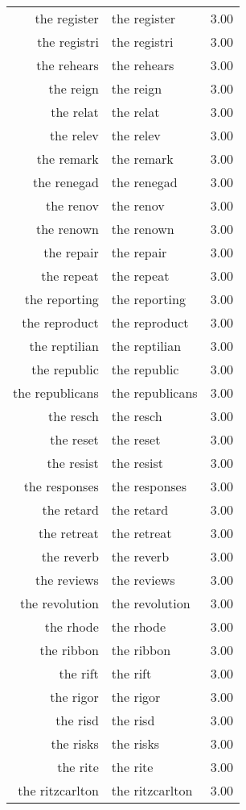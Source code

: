 \begin{table}[ht]
\begin{tabular}{rlr}
  the register & the register & 3.00 \\ 
  the registri & the registri & 3.00 \\ 
  the rehears & the rehears & 3.00 \\ 
  the reign & the reign & 3.00 \\ 
  the relat & the relat & 3.00 \\ 
  the relev & the relev & 3.00 \\ 
  the remark & the remark & 3.00 \\ 
  the renegad & the renegad & 3.00 \\ 
  the renov & the renov & 3.00 \\ 
  the renown & the renown & 3.00 \\ 
  the repair & the repair & 3.00 \\ 
  the repeat & the repeat & 3.00 \\ 
  the reporting & the reporting & 3.00 \\ 
  the reproduct & the reproduct & 3.00 \\ 
  the reptilian & the reptilian & 3.00 \\ 
  the republic & the republic & 3.00 \\ 
  the republicans & the republicans & 3.00 \\ 
  the resch & the resch & 3.00 \\ 
  the reset & the reset & 3.00 \\ 
  the resist & the resist & 3.00 \\ 
  the responses & the responses & 3.00 \\ 
  the retard & the retard & 3.00 \\ 
  the retreat & the retreat & 3.00 \\ 
  the reverb & the reverb & 3.00 \\ 
  the reviews & the reviews & 3.00 \\ 
  the revolution & the revolution & 3.00 \\ 
  the rhode & the rhode & 3.00 \\ 
  the ribbon & the ribbon & 3.00 \\ 
  the rift & the rift & 3.00 \\ 
  the rigor & the rigor & 3.00 \\ 
  the risd & the risd & 3.00 \\ 
  the risks & the risks & 3.00 \\ 
  the rite & the rite & 3.00 \\ 
  the ritzcarlton & the ritzcarlton & 3.00 \\ 

\end{tabular}
\end{table}
